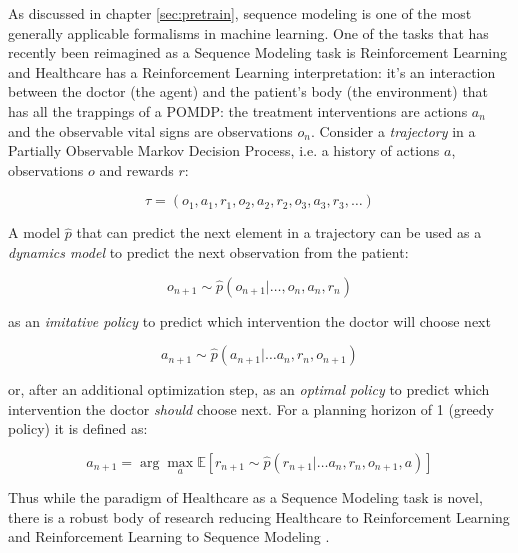 As discussed in chapter \ref{sec:pretrain}, sequence modeling is one of the most generally applicable formalisms in machine learning.
One of the tasks that has recently been reimagined as a Sequence Modeling task is Reinforcement Learning and Healthcare has a Reinforcement Learning interpretation: it's an interaction between the doctor (the agent) and the patient's body (the environment) that has all the trappings of a POMDP: the treatment interventions are actions $a_n$ and the observable vital signs are observations $o_n$.
Consider a \emph{trajectory} in a Partially Observable Markov Decision Process, i.e. a history of actions $a$, observations $o$ and rewards $r$:

\begin{equation}
    \tau = (o_1, a_1, r_1, o_2, a_2, r_2, o_3, a_3, r_3, \dots)
\end{equation}

A model $\hat{p}$ that can predict the next element in a trajectory can be used as a \emph{dynamics model} to predict the next observation from the patient:

\begin{equation}
    o_{n+1} \sim \hat{p}(o_{n+1} | \dots, o_n, a_n, r_n)
\end{equation}

as an \emph{imitative policy} to predict which intervention the doctor will choose next

\begin{equation}
    a_{n+1} \sim \hat{p}(a_{n+1} | \dots a_n, r_n, o_{n+1})
\end{equation}

or, after an additional optimization step, as an \emph{optimal policy} to predict which intervention the doctor \emph{should} choose next.
For a planning horizon of 1 (greedy policy) it is defined as:

\begin{equation}
    a_{n+1} = \arg \max_a \mathbb{E} [r_{n+1} \sim \hat{p}(r_{n+1} | \dots a_n, r_n, o_{n+1}, a)]
\end{equation}

Thus while the paradigm of Healthcare as a Sequence Modeling task is novel, there is a robust body of research reducing Healthcare to Reinforcement Learning \cite{yuReinforcementLearningHealthcare2021} and Reinforcement Learning to Sequence Modeling \cite{chenDecisionTransformerReinforcement2021, jannerOfflineReinforcementLearning2021, schmidhuberReinforcementLearningUpside2020}. 

